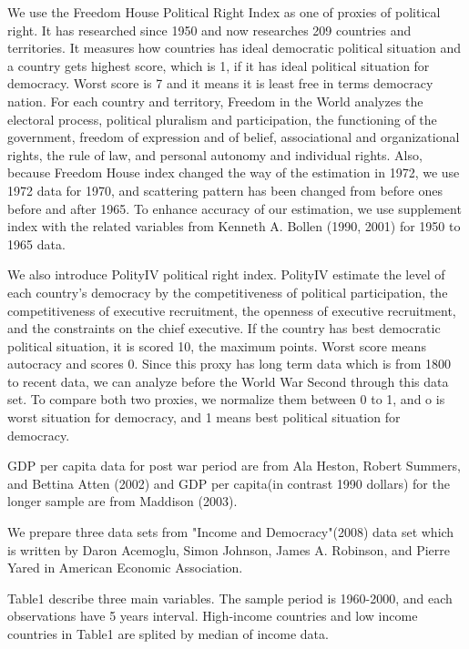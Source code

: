 \documentclass[a4paper,11pt]{article}
\begin{document}
We use the Freedom House Political Right Index as one of proxies of political right. It has researched since 1950 and now researches 209 countries and territories. It measures how countries has ideal democratic political situation and a country gets highest score, which is 1, if it has ideal political situation for democracy. Worst score is 7 and it means it is least free in terms democracy nation. For each country and territory, Freedom in the World analyzes the electoral process, political pluralism and participation, the functioning of the government, freedom of expression and of belief, associational and organizational rights, the rule of law, and personal autonomy and individual rights. Also, because Freedom House index changed the way of the estimation in 1972, we use 1972 data for 1970, and scattering pattern has been changed from before ones before and after 1965.  To enhance accuracy of our estimation, we use supplement index with the related variables from Kenneth A. Bollen (1990, 2001) for 1950 to 1965 data.


We also introduce PolityI\hspace{-.1em}V political right index. PolityI\hspace{-.1em}V estimate the level of each country’s democracy by the competitiveness of political participation, the competitiveness of executive recruitment, the openness of executive recruitment, and the constraints on the chief executive. If the country has best democratic political situation, it is scored 10, the maximum points. Worst score means autocracy and scores 0. Since this proxy has long term data which is from 1800 to recent data, we can analyze before the World War Second through this data set. To compare both two proxies, we normalize them between 0 to 1, and o is worst situation for democracy, and 1 means best political situation for democracy. 


GDP per capita data for post war period are from Ala Heston, Robert Summers, and Bettina Atten (2002) and GDP per capita(in contrast 1990 dollars) for the longer sample are from Maddison (2003).


We prepare three data sets from "Income and Democracy"(2008) data set which is written by Daron Acemoglu, Simon Johnson, James A. Robinson, and Pierre Yared in American Economic Association.

Table1 describe three main variables. The sample period is 1960-2000, and each observations have 5 years interval. High-income countries and low income countries in Table1 are splited by median of income data.
\end{document}
